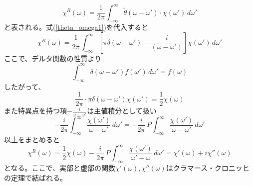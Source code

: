 \documentclass[11pt,a4j]{jreport}
\begin{document}
\begin{equation}
  \chi^R(\omega) = \frac{1}{2\pi}\int_{-\infty}^{\infty} \tilde{\theta}(\omega - \omega') \cdot \chi(\omega') \, d\omega'
\end{equation}
と表される。式(\ref{theta_omega1})を代入すると
\begin{equation}
  \chi^R(\omega) = \frac{1}{2\pi} \int_{-\infty}^{\infty} \left[ \pi \delta(\omega - \omega') - \frac{i}{(\omega - \omega')} \right]\chi(\omega') \, d\omega'
\end{equation}
ここで、デルタ関数の性質より
\begin{equation}
  \int_{-\infty}^{\infty} \delta(\omega - \omega') f(\omega') \, d\omega' = f(\omega)
\end{equation}
したがって、
\begin{equation}
  \frac{1}{2\pi} \cdot \pi \delta(\omega - \omega') \chi(\omega') = \frac{1}{2} \chi(\omega)
\end{equation}
また特異点を持つ項$-\frac{i}{\omega-\omega'}$は主値積分として扱い
\begin{equation}
  -\frac{i}{2\pi} \int_{-\infty}^{\infty} \frac{\chi(\omega')}{\omega - \omega'} \, d\omega' = -\frac{i}{2\pi} \, P\int_{-\infty}^{\infty} \frac{\chi(\omega')}{\omega - \omega'} \, d\omega'
\end{equation}
以上をまとめると
\begin{equation}
  \chi^R(\omega) = \frac{1}{2} \chi(\omega) - \frac{i}{2\pi} \, P \int_{-\infty}^{\infty} \frac{\chi(\omega')}{\omega' - \omega} \, d\omega'=\chi'(\omega)+i\chi''(\omega)
\end{equation}
となる。ここで、実部と虚部の関数$\chi'(\omega),\chi''(\omega)$はクラマース・クロニッヒの定理で結ばれる。
\end{document}
